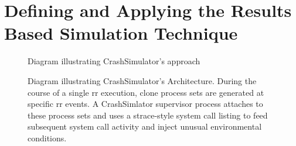 \section{Defining and Applying the Results Based Simulation Technique}
\label{SEC:approach}

\begin{figure}[t]
  \center{}
  \caption{Diagram illustrating CrashSimulator's approach}
  \label{figure:approach}
\end{figure}

\begin{figure}[t]
  \center{}
  \caption{Diagram illustrating CrashSimulator's Architecture.  During the
    course of a single rr execution, clone process sets are generated at
    specific rr events.  A CrashSimlator supervisor process attaches to
    these process sets and uses a strace-style system call listing to feed
    subsequent system call activity and inject unusual environmental
    conditions.}
  \label{figure:architecture}
\end{figure}

